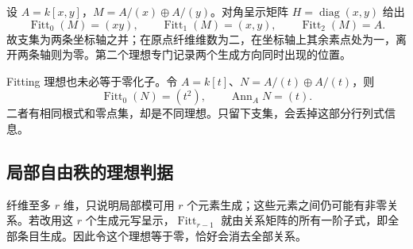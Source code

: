 \begin{example}\label{g5:exm:fitting-crossing-support}
	设 \(A=k[x,y]\)，\(M=A/(x)\oplus A/(y)\)。对角呈示矩阵 \(H=\operatorname{diag}(x,y)\) 给出
	\[
		\operatorname{Fitt}_0(M)=(xy),\qquad
		\operatorname{Fitt}_1(M)=(x,y),\qquad
		\operatorname{Fitt}_2(M)=A.
	\]
	故支集为两条坐标轴之并；在原点纤维维数为二，在坐标轴上其余素点处为一，离开两条轴则为零。第二个理想专门记录两个生成方向同时出现的位置。

	Fitting 理想也未必等于零化子。令 \(A=k[t]\)、\(N=A/(t)\oplus A/(t)\)，则
	\[
		\operatorname{Fitt}_0(N)=(t^2),\qquad
		\operatorname{Ann}_A N=(t).
	\]
	二者有相同根式和零点集，却是不同理想。只留下支集，会丢掉这部分行列式信息。
\end{example}

\subsection{局部自由秩的理想判据}
\label{g5:subsec:0602:04}

纤维至多 \(r\) 维，只说明局部模可用 \(r\) 个元素生成；这些元素之间仍可能有非零关系。若改用这 \(r\) 个生成元写呈示，\(\operatorname{Fitt}_{r-1}\) 就由关系矩阵的所有一阶子式，即全部条目生成。因此令这个理想等于零，恰好会消去全部关系。

